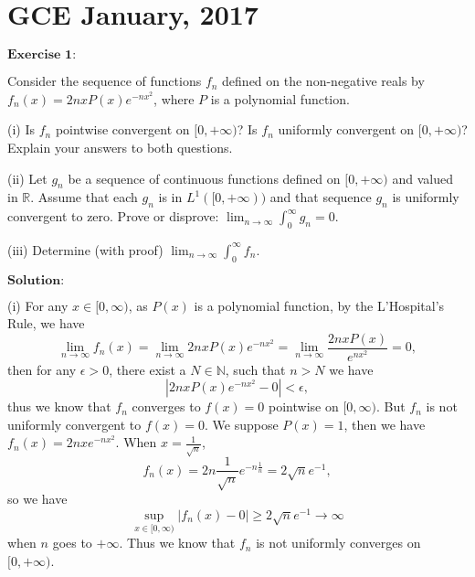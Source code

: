 \documentclass[12pt]{article}
\begin{document}
\newpage

\section{GCE January, 2017}

$\textbf{Exercise 1:}$

Consider the sequence of functions $f_{n}$ defined on the non-negative reals by $f_{n} (x) = 2 n x P(x) e^{-n x^{2}}$, where $P$ is a polynomial function.

(i) Is $f_{n}$ pointwise convergent on $[0, + \infty)$? Is $f_{n}$ uniformly convergent on $[0, + \infty)$? Explain your answers to both questions.

(ii) Let $g_{n}$ be a sequence of continuous functions defined on $[0, + \infty)$ and valued in $\mathbb{R}$. Assume that each $g_{n}$ is in $L^{1}([0, + \infty))$ and that sequence $g_{n}$ is uniformly convergent to zero. Prove or disprove: $\lim_{n \to \infty} \int_{0}^{\infty} g_{n} = 0$. 

(iii) Determine (with proof) $\lim_{n \to \infty} \int_{0}^{\infty}  f_{n}$.
  
\vspace{8pt}

$\textbf{Solution:}$

(i) For any $x \in [0, \infty)$, as $P(x)$ is a polynomial function, by the L'Hospital's Rule, we have
\begin{equation*}
    \lim_{n \to \infty} f_{n} (x) = \lim_{n \to \infty} 2 n x P(x) e^{-n x^{2}} = \lim_{n \to \infty} \frac{2 n x P(x)}{e^{n x^{2}}} = 0,
\end{equation*}
then for any $\epsilon > 0$, there exist a $N \in \mathbb{N}$, such that $n > N$ we have 
\begin{equation*}
    |2 n x P(x) e^{- n x^{2}} - 0| < \epsilon,
\end{equation*}
thus we know that $f_{n}$ converges to $f(x) = 0$ pointwise on $[0, \infty)$. But $f_{n}$ is not uniformly convergent to $f(x) = 0$. We suppose $P(x) = 1$, then we have $f_{n}(x) = 2 n x e^{-n x^{2}} $. When $x = \frac{1}{\sqrt{n}}$, 
\begin{equation*}
    f_{n} (x) = 2 n \frac{1}{\sqrt{n}} e^{- n \frac{1}{n}} = 2 \sqrt{n} e^{-1},
\end{equation*}
so we have
\begin{equation*}
    \sup_{x \in [0, \infty)} |f_{n} (x) - 0| \geq 2 \sqrt{n} e^{-1} \to \infty
\end{equation*}
when $n$ goes to $+ \infty$. Thus we know that $f_{n}$ is not uniformly converges on $[0, + \infty)$. 
\end{document}

